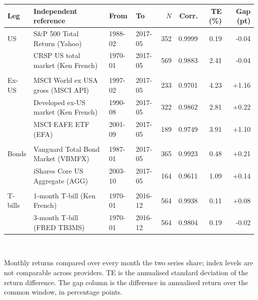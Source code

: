 \footnotesize
\begin{tabular}{llllrrrr}
\toprule
Leg & Independent reference & From & To & $N$ & Corr. & TE (\%) & Gap (pt) \\
\midrule
US & S\&P 500 Total Return (Yahoo) & 1988-02 & 2017-05 & 352 & 0.9999 & 0.19 & -0.04 \\
 & CRSP US total market (Ken French) & 1970-01 & 2017-05 & 569 & 0.9883 & 2.41 & -0.04 \\
\addlinespace \\
Ex-US & MSCI World ex USA gross (MSCI API) & 1997-02 & 2017-05 & 233 & 0.9701 & 4.23 & +1.16 \\
 & Developed ex-US market (Ken French) & 1990-08 & 2017-05 & 322 & 0.9862 & 2.81 & +0.22 \\
 & MSCI EAFE ETF (EFA) & 2001-09 & 2017-05 & 189 & 0.9749 & 3.91 & +1.10 \\
\addlinespace \\
Bonds & Vanguard Total Bond Market (VBMFX) & 1987-01 & 2017-05 & 365 & 0.9923 & 0.48 & +0.21 \\
 & iShares Core US Aggregate (AGG) & 2003-10 & 2017-05 & 164 & 0.9611 & 1.09 & +0.14 \\
\addlinespace \\
T-bills & 1-month T-bill (Ken French) & 1970-01 & 2016-12 & 564 & 0.9938 & 0.11 & +0.08 \\
 & 3-month T-bill (FRED TB3MS) & 1970-01 & 2016-12 & 564 & 0.9804 & 0.19 & -0.02 \\
\bottomrule
\end{tabular}
\\[0.4em]
\begin{minipage}{\linewidth}\footnotesize Monthly returns compared over every month the two series share; index levels are not comparable across providers. TE is the annualised standard deviation of the return difference. The gap column is the difference in annualised return over the common window, in percentage points.\end{minipage}
